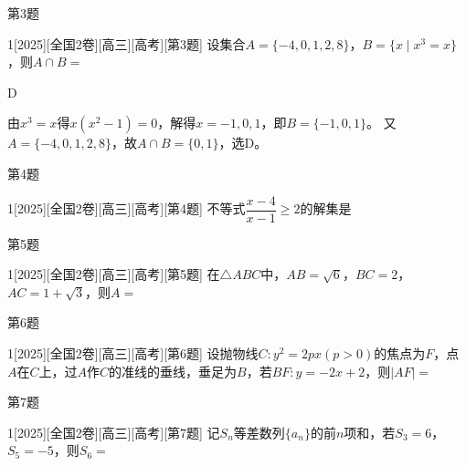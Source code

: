 \begin{frame}[allowframebreaks]{第3题}
\begin{example}{1}[2025][全国2卷][高三][高考][第3题]
设集合$A=\{-4,0,1,2,8\}$，$B=\{x\mid x^3=x\}$，则$A\cap B=$\blankbox
\begin{choices}
\end{choices}
\end{example}
\begin{answer}
D
\end{answer}
\begin{solutions}
由$x^3=x$得$x(x^2-1)=0$，解得$x=-1,0,1$，即$B=\{-1,0,1\}$。
		又$A=\{-4,0,1,2,8\}$，故$A\cap B=\{0,1\}$，选D。
\end{solutions}
\end{frame}
\begin{frame}[allowframebreaks]{第4题}
\begin{example}{1}[2025][全国2卷][高三][高考][第4题]
不等式$\dfrac{x-4}{x-1}\ge 2$的解集是\blankbox
\begin{choices}
\end{choices}
\end{example}
\end{frame}
\begin{frame}[allowframebreaks]{第5题}
\begin{example}{1}[2025][全国2卷][高三][高考][第5题]
在$\triangle ABC$中，$AB=\sqrt{6}$，$BC=2$，$AC=1+\sqrt{3}$，则$A=$\blankbox
\begin{choices}
\end{choices}
\end{example}
\end{frame}
\begin{frame}[allowframebreaks]{第6题}
\begin{example}{1}[2025][全国2卷][高三][高考][第6题]
设抛物线$C:y^2=2px(p>0)$的焦点为$F$，点$A$在$C$上，过$A$作$C$的准线的垂线，垂足为$B$，若$BF:y=-2x+2$，则$|AF|=$\blankbox
\begin{choices}
\end{choices}
\end{example}
\end{frame}
\begin{frame}[allowframebreaks]{第7题}
\begin{example}{1}[2025][全国2卷][高三][高考][第7题]
记$S_n$等差数列$\{a_n\}$的前$n$项和，若$S_3=6$，$S_5=-5$，则$S_6=$\blankbox
\begin{choices}
\end{choices}
\end{example}
\end{frame}
